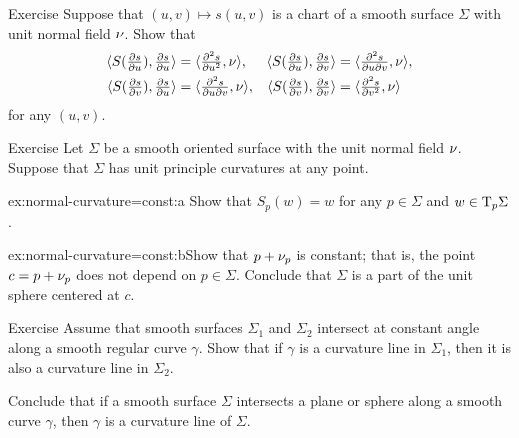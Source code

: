 \begin{thm}{Exercise}\label{ex:shape-chart}
Suppose that $(u,v)\mapsto s(u,v)$ is a chart of a smooth surface $\Sigma$ with unit normal field $\nu$.
Show that 
\begin{align*}
\langle S(\tfrac{\partial s}{\partial u}), \tfrac{\partial s}{\partial u}\rangle 
&=\langle \tfrac{\partial^2 s}{\partial u^2},\nu\rangle,
&
\langle S(\tfrac{\partial s}{\partial u}), \tfrac{\partial s}{\partial v}\rangle 
&=\langle \tfrac{\partial^2 s}{\partial u \partial v},\nu\rangle,
\\
\langle S(\tfrac{\partial s}{\partial v}), \tfrac{\partial s}{\partial u}\rangle 
&=\langle \tfrac{\partial^2 s}{\partial u \partial v},\nu\rangle,
&
\langle S(\tfrac{\partial s}{\partial v}), \tfrac{\partial s}{\partial v}\rangle 
&=\langle \tfrac{\partial^2 s}{\partial v^2},\nu\rangle
\end{align*}
for any $(u,v)$.

\end{thm}

\begin{thm}{Exercise}\label{ex:normal-curvature=const}
Let $\Sigma$ be a smooth oriented surface with the unit normal field $\nu$.
Suppose that $\Sigma$ has unit principle curvatures at any point.

\begin{subthm}{ex:normal-curvature=const:a} Show that $S_p(w)=w$ for any $p\in\Sigma$ and $w\in \mathrm{T}_p\Sigma$.
\end{subthm}

\begin{subthm}{ex:normal-curvature=const:b}Show that $p+\nu_p$ is constant; that is, the point $c=p+\nu_p$ does not depend on $p\in\Sigma$.
Conclude that $\Sigma$ is a part of the unit sphere centered at $c$.
\end{subthm}

\end{thm}

\begin{thm}{Exercise}\label{ex:shape-curvature-line}
Assume that smooth surfaces $\Sigma_1$ and $\Sigma_2$ intersect at constant angle along a smooth regular curve $\gamma$.
Show that if $\gamma$ is a curvature line in $\Sigma_1$, then it is also a curvature line in $\Sigma_2$.

Conclude that if a smooth surface $\Sigma$ intersects a plane or sphere along a smooth curve $\gamma$,
then $\gamma$ is a curvature line of $\Sigma$.
\end{thm}
